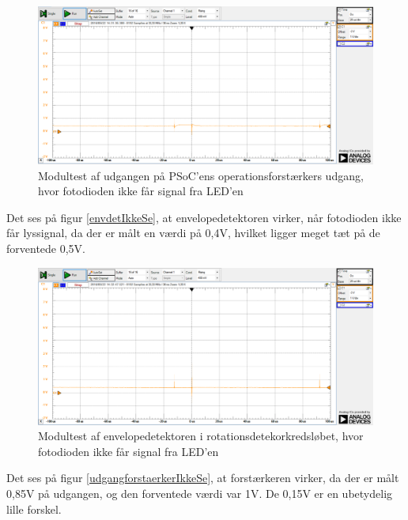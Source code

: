\begin{figure}[H]
	\centering
	\includegraphics[width=\textwidth]{Test/images/AffyringTest/IkkeSe/udgang_opamp_psoc}
	\caption{Modultest af udgangen på PSoC'ens operationsforstærkers udgang, hvor fotodioden ikke får signal fra LED'en}
	\label{fig:udgangOpAmpIkkeSe}
\end{figure}

Det ses på figur \ref{envdetIkkeSe}, at envelopedetektoren virker, når fotodioden ikke får lyssignal, da der er målt en værdi på 0,4V, hvilket ligger meget tæt på de forventede 0,5V. 

\begin{figure}[H]
	\centering
	\includegraphics[width=\textwidth]{Test/images/AffyringTest/IkkeSe/envelopedetektor}
	\caption{Modultest af envelopedetektoren i rotationsdetekorkredsløbet, hvor fotodioden ikke får signal fra LED'en}
	\label{fig:envdetIkkeSe}
\end{figure}

Det ses på figur \ref{udgangforstaerkerIkkeSe}, at forstærkeren virker, da der er målt 0,85V på udgangen, og den forventede værdi var 1V. De 0,15V er en ubetydelig lille forskel. 

